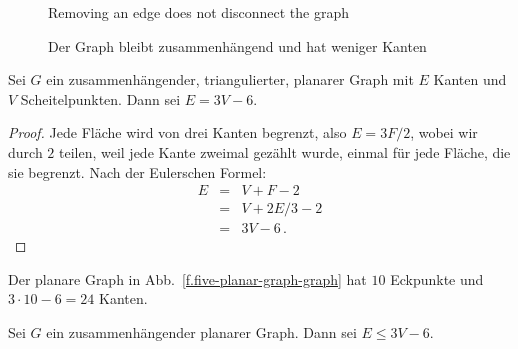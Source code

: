 \begin{figure}[ht]
\begin{minipage}{.45\textwidth}
\begin{center}
\caption{Removing an edge does not disconnect the graph}\label{f.five-connected-remains}
\end{center}
\end{minipage}
\hfill
\begin{minipage}{.45\textwidth}
\begin{center}
\caption{Der Graph bleibt zusammenhängend und hat weniger Kanten}\label{f.five-connected-fewer}
\end{center}
\end{minipage}
\end{figure}

\begin{theorem}\label{thm.3v6}
Sei $G$ ein zusammenhängender, triangulierter, planarer Graph mit $E$ Kanten und $V$ Scheitelpunkten. Dann sei $E= 3V-6$.
\end{theorem}
\begin{proof}
Jede Fläche wird von drei Kanten begrenzt, also $E=3F/2$, wobei wir durch $2$ teilen, weil jede Kante zweimal gezählt wurde, einmal für jede Fläche, die sie begrenzt. Nach der Eulerschen Formel:
\begin{eqnarray*}
E&=&V+F-2\\
&=&V+2E/3-2\\
&=&3V-6\,.
\end{eqnarray*}
\end{proof}

\begin{example}
Der planare Graph in Abb.~\ref{f.five-planar-graph-graph} hat $10$ Eckpunkte und $3\cdot 10-6=24$ Kanten.
\end{example}

\begin{theorem}\label{thm.count}
Sei $G$ ein zusammenhängender planarer Graph. Dann sei $E\leq 3V-6$.
\end{theorem}

